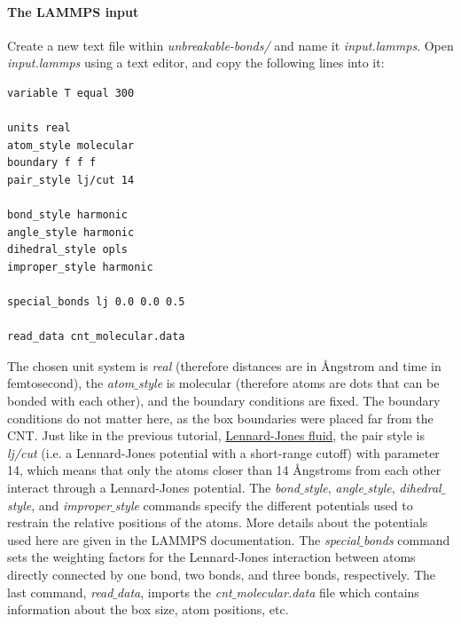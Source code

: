 \documentclass[9pt,tutorial]{livecoms}
\begin{document}
\paragraph{The LAMMPS input}
Create a new text file within \textit{unbreakable-bonds/} and name it \textit{input.lammps}. Open \textit{input.lammps} using a text editor, and copy the following lines into it:
{\normalsize \begin{verbatim}
variable T equal 300

units real
atom_style molecular
boundary f f f
pair_style lj/cut 14

bond_style harmonic
angle_style harmonic
dihedral_style opls
improper_style harmonic

special_bonds lj 0.0 0.0 0.5

read_data cnt_molecular.data
\end{verbatim}}
The chosen unit system is \textit{real} (therefore distances are in Ångstrom and time in femtosecond), the \textit{atom$\_$style} is molecular (therefore atoms are dots that can be bonded with each other), and the boundary conditions are fixed. The boundary conditions do not matter here, as the box boundaries were placed far from the CNT. Just like in the previous tutorial, \hyperref[lennard-jones-label]{Lennard-Jones fluid}, the pair style is \textit{lj/cut} (i.e. a Lennard-Jones potential with a short-range cutoff) with parameter 14, which means that only the atoms closer than 14 Ångstroms from each other interact through a Lennard-Jones potential. The \textit{bond$\_$style}, \textit{angle$\_$style}, \textit{dihedral$\_$style}, and \textit{improper$\_$style} commands specify the different potentials used to restrain the relative positions of the atoms. More details about the potentials used here are given in the LAMMPS documentation. The \textit{special$\_$bonds} command sets the weighting factors for the Lennard-Jones interaction between atoms directly connected by one bond, two bonds, and three bonds, respectively. The last command, \textit{read$\_$data}, imports the \textit{cnt$\_$molecular.data} file which contains information about the box size, atom positions, etc.
\end{document}

